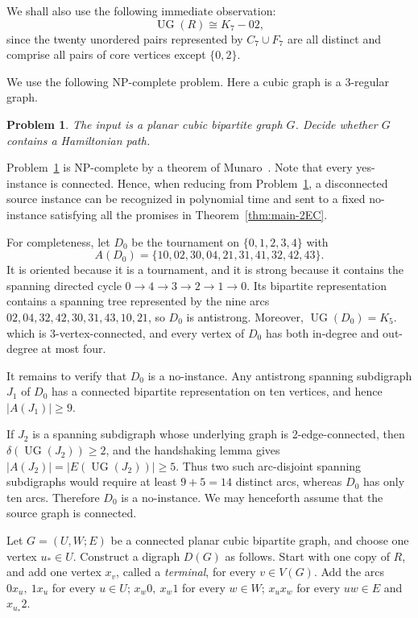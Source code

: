 \documentclass[12pt]{article}
\newtheorem{problem}[theorem]{Problem}
\theoremstyle{remark}
\newcommand{\UG}{\operatorname{UG}}
\begin{document}
We shall also use the following immediate observation:
\begin{equation}\label{eq:underlying-core}
   \UG(R)\cong K_7-02,
\end{equation}
since the twenty unordered pairs represented by $C_7\cup F_7$ are all distinct and comprise all pairs of core vertices except $\{0,2\}$.

We use the following NP-complete problem. Here a cubic graph is a 3-regular graph.

\begin{problem}
\label{prob:PCBHAM}
The input is a planar cubic bipartite graph $G$. Decide whether $G$ contains a Hamiltonian path.
\end{problem}

Problem~\ref{prob:PCBHAM} is NP-complete by a theorem of
Munaro~\cite[Theorem~23]{Munaro}.  Note that every yes-instance is connected.  Hence, when reducing from
Problem~\ref{prob:PCBHAM}, a disconnected source instance can be recognized in polynomial time and sent to a fixed no-instance satisfying all the promises in Theorem~\ref{thm:main-2EC}.

For completeness, let $D_0$ be the tournament on
$\{0,1,2,3,4\}$ with
\[
 A(D_0)=\{10,02,30,04,21,31,41,32,42,43\}.
\]
It is oriented because it is a tournament, and it is strong because
it contains the spanning directed cycle $0\to 4\to 3\to 2\to 1\to 0$.
Its bipartite representation contains a spanning tree represented by the nine arcs
$02,04,32,42,30,31,43,10,21$,
so $D_0$ is antistrong.  Moreover, $\UG(D_0)=K_5$.
which is 3-vertex-connected, and every vertex of $D_0$ has both in-degree and out-degree at most four.

It remains to verify that $D_0$ is a no-instance.  Any antistrong spanning subdigraph $J_1$ of $D_0$ has a connected bipartite representation on ten vertices, and hence $|A(J_1)|\ge 9$.

If $J_2$ is a spanning subdigraph whose underlying graph is 2-edge-connected, then $\delta(\UG(J_2))\ge 2$,
and the handshaking lemma gives $|A(J_2)|=|E(\UG(J_2))|\ge 5$.
Thus two such arc-disjoint spanning subdigraphs would require at
least $9+5=14$ distinct arcs, whereas $D_0$ has only ten arcs.
Therefore $D_0$ is a no-instance.  We may henceforth assume that the
source graph is connected.

Let $G=(U,W;E)$ be a connected planar cubic bipartite graph, and choose
one vertex $u_*\in U$.  Construct a digraph $D(G)$ as follows. Start with one copy of $R$, and add one vertex $x_v$, called a \emph{terminal}, for every $v\in V(G)$. Add the arcs $0x_u,\ 1x_u$ for every $u\in U$;
$x_w0,\ x_w1$ for every $w\in W$; $x_ux_w$ for every $uw\in E$ and $x_{u_*}2$.
\end{document}
